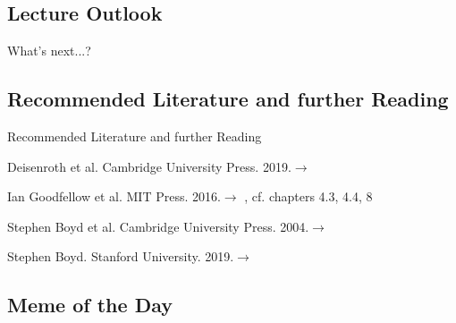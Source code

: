 \subsection{Lecture Outlook}

\begin{frame}{What's next...?}{}
\end{frame}


\subsection{Recommended Literature and further Reading}

\begin{frame}[allowframebreaks]{Recommended Literature and further Reading}{}
	\footnotesize
	\begin{thebibliography}{2}
			{Deisenroth et al. Cambridge University Press. 2019.}{$\rightarrow$ \href{
				https://mml-book.github.io/
			}{}}

			{Ian Goodfellow et al. MIT Press. 2016.}{$\rightarrow$ \href{
				http://www.deeplearningbook.org/
			}{}, cf. chapters 4.3, 4.4, 8}

			{Stephen Boyd et al. Cambridge University Press. 2004.}{$\rightarrow$ \href{
				http://web.stanford.edu/~boyd/cvxbook/bv_cvxbook.pdf
			}{}}

			{Stephen Boyd. Stanford University. 2019.}{$\rightarrow$ \href{
				https://web.stanford.edu/class/ee364a/lectures.html
			}{}}

	\end{thebibliography}
\end{frame}


\subsection{Meme of the Day}

